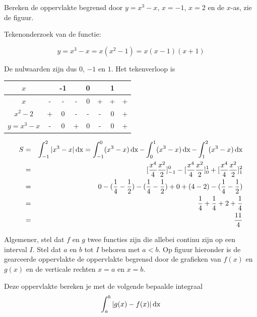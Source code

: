 \begin{voorbeeld}
Bereken de oppervlakte begrensd door $y=x^3-x$, $x=-1$, $x=2$ en de $x$-as, zie de figuur.


Tekenonderzoek van de functie:

\begin{equation*}
y=x^3-x=x(x^2-1)=x(x-1)(x+1)
\end{equation*}

De nulwaarden zijn dus $0$, $-1$ en $1$. Het tekenverloop is
\begin{center}
	\begin{tabular}{c|ccccccc}
	$x$ & & -1 & & 0 & & 1 & \\
	\hline
	$x$ & - & - & -& 0 & + & + & + \\
	$x^2-2$ & + & 0 & -& - & - & 0 & + \\
	\hline 
	$y=x^3-x$ & - & 0 & +& 0 & - & 0 & + 
	\end{tabular}
\end{center}

\begin{eqnarray*}
S &=& \int_{-1}^{2}|x^3-x|\operatorname{dx} = \int_{-1}^{0}(x^3-x)\operatorname{dx} - \int_{0}^{1}(x^3-x)\operatorname{dx} - \int_{1}^{2}(x^3-x)\operatorname{dx} \\
&=& [\frac{x^4}{4}\frac{x^2}{2}]_{-1}^{0} - [\frac{x^4}{4}\frac{x^2}{2}]_{0}^{1} + [\frac{x^4}{4}\frac{x^2}{2}]_{1}^{2} \\
&=& 0 - (\frac{1}{4}-\frac{1}{2}) - (\frac{1}{4}-\frac{1}{2}) + 0 + (4-2) - (\frac{1}{4}-\frac{1}{2}) \\
&=& \frac{1}{4} + \frac{1}{4} + 2 + \frac{1}{4} \\
&=& \frac{11}{4}
\end{eqnarray*}

\end{voorbeeld}

Algemener, stel dat $f$ en $g$ twee functies zijn die allebei continu zijn op een interval $I$. Stel dat $a$ en $b$ tot $I$ behoren met $a<b$. Op figuur hieronder is de gearceerde oppervlakte de oppervlakte begrensd door de grafieken van $f(x)$ en $g(x)$ en de verticale rechten $x=a$ en $x=b$.


Deze oppervlakte bereken je met de volgende bepaalde integraal
\begin{equation*}
\int_{a}^{b} | g(x)-f(x)| \operatorname{dx}
\end{equation*}

